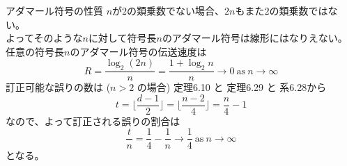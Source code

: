 \documentclass[dvipdfmx,10pt,jsarticle]{beamer}
\begin{document}
  \begin{frame}{アダマール符号の性質}
    $n$が$2$の類乗数でない場合、$2n$もまた$2$の類乗数ではない。 \\
    よってそのような$n$に対して符号長$n$のアダマール符号は線形にはなりえない。\\
    任意の符号長$n$のアダマール符号の伝送速度は
    \[ R = \frac{\log_2 (2n)}{n} = \frac{1 + \log_2 n}{n} \rightarrow 0 \ \text{as} \ n \rightarrow \infty \]
    訂正可能な誤りの数は ($n > 2$ の場合) 定理6.10 と 定理6.29 と 系6.28から
    \[t = \lfloor \frac{d-1}{2} \rfloor = \lfloor \frac{n -2}{4} \rfloor = \frac n4 - 1 \]
    なので、よって訂正される誤りの割合は
    \[ \frac tn = \frac 14 - \frac 1n \rightarrow \frac 14 \ \text{as} \ n \rightarrow \infty \]
    となる。
  \end{frame}
\end{document}
